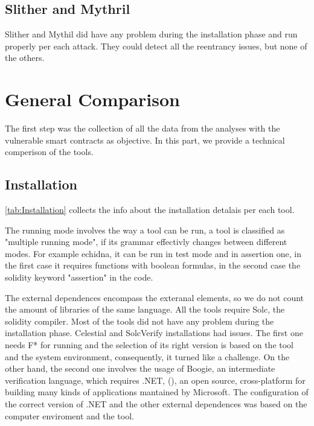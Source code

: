 \subsection*{Slither and Mythril} Slither and Mythil did have any problem during the installation phase and run properly per each attack. 
They could detect all the reentrancy issues, but none of the others.

\section{General Comparison}

The first step was the collection of all the data from the analyses with the vulnerable smart contracts as objective. 
In this part, we provide a technical comperison of the tools. 


\subsection{Installation} 
\autoref{tab:Installation} collects the info about the installation detalais per each tool. 

The running mode involves the way a tool can be run, a tool is classified as "multiple running mode", if its grammar effectivly changes between different modes. For example echidna, it can be run in 
test mode and in assertion one, in the first case it requires functions with boolean formulas, in the second case the solidity keyword "assertion" in the code.

The external dependences encompass the exteranal elements, so we do not count the amount of libraries of the same language. 
All the tools require Solc, the solidity compiler. 
Most of the tools did not have any problem during the installation phase. Celestial and SolcVerify installations had issues.  
The first one needs F* for running and the selection of its right version is
based on the tool and the system environment, consequently, it turned like a challenge. 
On the other hand, the second one involves the usage of Boogie, an intermediate verification language, which requires .NET, (\cite{NET}), 
an open source, cross-platform for building many kinds of applications mantained by Microsoft. 
The configuration of the correct version of .NET and the other external dependences was based on the computer enviroment and the tool. 

